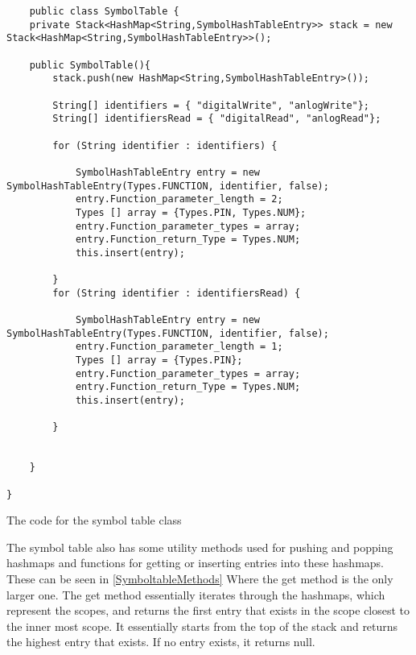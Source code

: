 \begin{listing}[htb!]
    \begin{verbatim}
    public class SymbolTable {
    private Stack<HashMap<String,SymbolHashTableEntry>> stack = new Stack<HashMap<String,SymbolHashTableEntry>>();
    
    public SymbolTable(){
        stack.push(new HashMap<String,SymbolHashTableEntry>());
        
        String[] identifiers = { "digitalWrite", "anlogWrite"};
        String[] identifiersRead = { "digitalRead", "anlogRead"};

        for (String identifier : identifiers) {
            
            SymbolHashTableEntry entry = new SymbolHashTableEntry(Types.FUNCTION, identifier, false);
            entry.Function_parameter_length = 2;
            Types [] array = {Types.PIN, Types.NUM};
            entry.Function_parameter_types = array;
            entry.Function_return_Type = Types.NUM;
            this.insert(entry);
            
        }
        for (String identifier : identifiersRead) {
            
            SymbolHashTableEntry entry = new SymbolHashTableEntry(Types.FUNCTION, identifier, false);
            entry.Function_parameter_length = 1;
            Types [] array = {Types.PIN};
            entry.Function_parameter_types = array;
            entry.Function_return_Type = Types.NUM;
            this.insert(entry);
            
        }


    }

}
\end{verbatim}
\caption{The code for the symbol table class}
\label{lst:SymbolTable}
\end{listing}

The symbol table also has some utility methods used for pushing and popping hashmaps and functions for getting or inserting entries into these hashmaps. These can be seen in \ref{SymboltableMethods} Where the get method is the only larger one. The get method essentially iterates through the hashmaps, which represent the scopes, and returns the first entry that exists in the scope closest to the inner most scope. It essentially starts from the top of the stack and returns the highest entry that exists. If no entry exists, it returns null.


